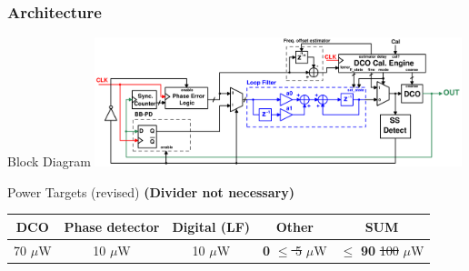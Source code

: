 \documentclass[t, screen, aspectratio=43]{beamer}
\begin{document}
\begin{frame}
	\frametitle{Architecture}
	\begin{block}{Block Diagram}
	\center\includegraphics[width=0.8\textwidth, angle=0]{pll_master_arch_28feb2020}

	\end{block}
		\begin{block}{Power Targets {\color{red}(revised)}}
		\scriptsize
		{\color{red}\textbf{(Divider not necessary)}}
		\vspace{-1em}
		\begin{table}[htb!]
			\tiny
			\centering
			\def\arraystretch{1.5}		
			\setlength\arrayrulewidth{0.75pt}
			\setlength{\tabcolsep}{1em} %
			\begin{tabular}{|c|c|c|c|c|}
				\hline 
				\rule[-1ex]{0pt}{2.5ex} \cellcolor{gray!40}\textbf{DCO} & \cellcolor{gray!40}\textbf{Phase detector} & \cellcolor{gray!40}\textbf{Digital (LF)}& \cellcolor{gray!40}\textbf{Other} & \cellcolor{gray!40}\textbf{SUM} \\ 
				\hline 
				\rule[-1ex]{0pt}{2.5ex} 70 $\mu$W& 10 $\mu$W &  10 $\mu$W  & \textbf{0} {\color{red}\st{$\leq$ 5}} $ \mu$W & $\leq$ \textbf{90} {\color{red}\st{100}} $\mu$W\\ 
				\hline 
			\end{tabular} 
		\end{table}   
	\end{block}

\end{frame}

\end{document}
